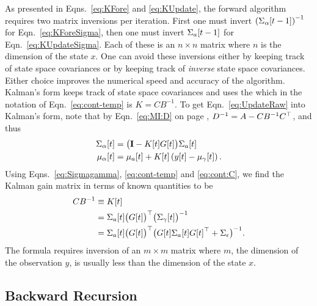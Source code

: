 As presented in Eqns.~\eqref{eq:KFore} and \eqref{eq:KUpdate}, the
forward algorithm requires two matrix inversions per iteration.  First
one must invert $\left( {\Sigma_\alpha}{[t-1]}\right)^{-1}$ for
Eqn.~\eqref{eq:KForeSigma}, then one must invert ${\Sigma_a}{[t-1]}$
for Eqn.~\eqref{eq:KUpdateSigma}.  Each of these is an $n\times n$
matrix where $n$ is the dimension of the state $x$.  One can avoid
these inversions either by keeping track of state space covariances or
by keeping track of \emph{inverse} state space covariances.  Either
choice improves the numerical speed and accuracy of the algorithm.
Kalman's form keeps track of state space covariances and uses the
\emph{} %
%
which in the notation of Eqn.~\eqref{eq:cont-temp} is $K=CB^{-1}$.  To
get Eqn.~\eqref{eq:UpdateRaw} into Kalman's form, note that by
Eqn.~\eqref{eq:MI:D} on page \pageref{eq:MI:D},
$D^{-1} = A -CB^{-1} C^\top$, and thus
\begin{subequations}
  \label{eq:KalmanGain}
  \begin{align}
    {\Sigma_\alpha}{[t]} &= \big({\bf I} - {K}{[t]} {G}{[t]}
    \big) {\Sigma_a}{[t]} \\
    {\mu_\alpha}{[t]} &= {\mu_a}{[t]} + {K}{[t]} \left(
      {y}{[t]} - {\mu_\gamma}{[t]}\right).
  \end{align}
\end{subequations}
Using Eqns.~\eqref{eq:Sigmagamma}, \eqref{eq:cont-temp} and
\eqref{eq:cont:C}, we find the Kalman gain matrix in terms of known
quantities to be
\begin{align*}
  CB^{-1} &\equiv {K}{[t]}\\
  &= {\Sigma_{a}}{[t]} \big({G}{[t]} \big)^\top \big(
  {\Sigma_\gamma}{[t]}\big)^{-1}\\
  &= {\Sigma_{a}}{[t]} \big({G}{[t]} \big)^\top \big({G}{[t]}{\Sigma_a}{[t]}{G}{[t]}^\top +
    \Sigma_\epsilon \big)^{-1}.
\end{align*}
The formula requires inversion of an $m\times m$ matrix where $m$, the
dimension of the observation $y$, is usually less than the dimension of
the state $x$.

\subsection{Backward Recursion}
\label{sec:DetailBack}

